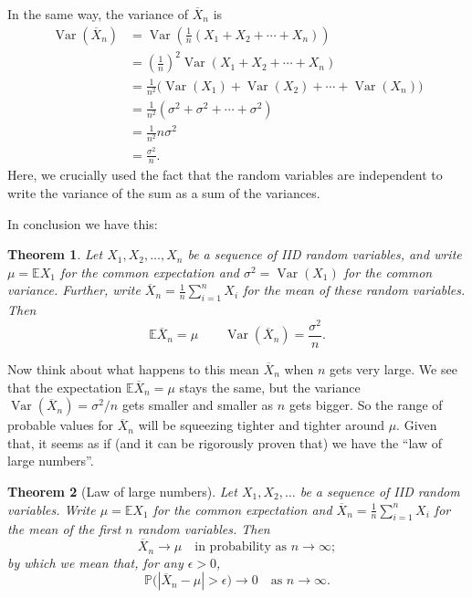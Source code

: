 \documentclass[
  a4paper,
]{book}
\newtheorem{theorem}{Theorem}[chapter]
\theoremstyle{definition}
\theoremstyle{definition}
\theoremstyle{definition}
\theoremstyle{definition}
\theoremstyle{remark}
\begin{document}
In the same way, the variance of \(\overline X_n\) is
\begin{align*}
\operatorname{Var}( \overline X_n) &= \operatorname{Var}\left( \frac{1}{n} (X_1 + X_2 + \cdots + X_n)\right) \\
&= \left(\frac{1}{n}\right)^2 \operatorname{Var}(X_1 + X_2 + \cdots + X_n) \\
&=   \frac{1}{n^2} \big(\operatorname{Var}(X_1) + \operatorname{Var}(X_2) + \cdots + \operatorname{Var}(X_n)\big)\\
&= \frac{1}{n^2} (\sigma^2 + \sigma^2+ \cdots + \sigma^2)\\
&= \frac{1}{n^2} n \sigma^2 \\
&= \frac{\sigma^2}{n} .
\end{align*}
Here, we crucially used the fact that the random variables are independent to write the variance of the sum as a sum of the variances.

In conclusion we have this:

\begin{theorem}
Let \(X_1, X_2, \dots, X_n\) be a sequence of IID random variables, and write \(\mu = \mathbb EX_1\) for the common expectation and \(\sigma^2 = \operatorname{Var}(X_1)\) for the common variance. Further, write
\(\overline X_n =\frac{1}{n} \sum_{i=1}^n X_i\) for the mean of these random variables. Then
\[ \mathbb E \overline X_n = \mu \qquad \operatorname{Var}(\overline X_n) = \frac{\sigma^2}{n} . \]
\end{theorem}

Now think about what happens to this mean \(\overline X_n\) when \(n\) gets very large. We see that the expectation \(\mathbb E\overline X_n = \mu\) stays the same, but the variance \(\operatorname{Var}(\overline X_n) = \sigma^2/n\) gets smaller and smaller as \(n\) gets bigger. So the range of probable values for \(\overline X_n\) will be squeezing tighter and tighter around \(\mu\). Given that, it seems as if (and it can be rigorously proven that) we have the ``law of large numbers''.

\begin{theorem}[Law of large numbers]
\protect\hypertarget{thm:thLLN}{}\label{thm:thLLN}Let \(X_1, X_2, \dots\) be a sequence of IID random variables. Write \(\mu = \mathbb EX_1\) for the common expectation and \(\overline X_n =\frac{1}{n} \sum_{i=1}^n X_i\) for the mean of the first \(n\) random variables. Then
\[ \overline X_n \to \mu \quad \text{in probability as $n \to \infty$}; \]
by which we mean that, for any \(\epsilon > 0\),
\[ \mathbb P\big(|\overline X_n - \mu| > \epsilon\big) \to 0 \quad \text{as $n\to\infty$.} \]
\end{theorem}
\end{document}
